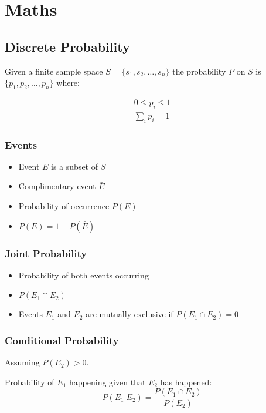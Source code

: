 \documentclass[a4paper]{article}
\begin{document}
\tableofcontents

\section{Maths}

\subsection{Discrete Probability}

Given a finite sample space $S = \{s_{1}, s_{2}, \ldots, s_{n}\}$ the probability
$P$ on $S$ is $\{p_{1}, p_{2}, \ldots,p_{n}\}$ where:

\begin{align*}
  0 \leq p_{i} \leq 1 \\
  \sum_{i}p_{i} = 1
\end{align*}

\subsubsection{Events}

\begin{itemize}
  \item Event $E$ is a subset of $S$
  \item Complimentary event $\bar{E}$
  \item Probability of occurrence $P(E)$
  \item $P(E) = 1 - P(\bar{E})$
\end{itemize}

\subsubsection{Joint Probability}

\begin{itemize}
  \item Probability of both events occurring
  \item $P(E_{1} \cap E_{2})$
  \item Events $E_{1}$ and $E_{2}$ are mutually exclusive if $P(E_{1} \cap
        E_{2}) = 0$
\end{itemize}

\subsubsection{Conditional Probability}

Assuming $P(E_{2}) > 0$.

Probability of $E_{1}$ happening given that $E_{2}$ has happened:
\[
  P(E_{1} | E_{2}) = \frac{P(E_{1} \cap E_{2})}
                          {P(E_{2})}
\]
\end{document}
